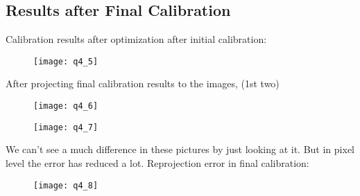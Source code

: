 	\pagebreak
	\subsection{Results after Final Calibration}
	\newline
	Calibration results after optimization after initial calibration:\newline
	\begin{figure}[position = here]
		\begin{centering}
			\texttt{[image: q4\_5]}\\
		\end{centering}
	\end{figure}
	\newline
	After projecting final calibration results to the images, (1st two)\newline
	
	
	\begin{figure}[position = here]
		\begin{centering}
			\texttt{[image: q4\_6]}\\
		\end{centering}
	\end{figure}
	\newline
	\pagebreak
	\begin{figure}[position = here]
		\begin{centering}
			\texttt{[image: q4\_7]}\\
		\end{centering}
	\end{figure}
	\newline
	We can’t see a much difference in these pictures by just looking at it. But in pixel level the error has reduced a lot.\newline \newline
	Reprojection error in final calibration:\newline
	
	
	\begin{figure}[position = here]
		\begin{centering}
			\texttt{[image: q4\_8]}\\
		\end{centering}
	\end{figure}
	\newline
	
	\pagebreak
	



\pagebreak